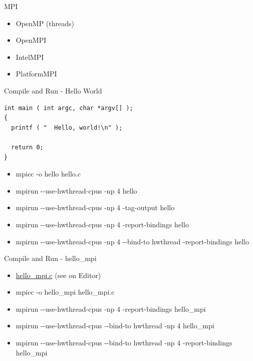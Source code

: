 \documentclass[ignorenonframetext,]{beamer}
\providecommand{\tightlist}{%
  \setlength{\itemsep}{0pt}\setlength{\parskip}{0pt}}
\begin{document}
\begin{frame}{MPI}


\begin{itemize}
\tightlist
\item
  OpenMP (threads)
\item
  OpenMPI
\item
  IntelMPI
\item
  PlatformMPI
\end{itemize}


\end{frame}

\begin{frame}[fragile]{Compile and Run - Hello World}

\begin{verbatim}
int main ( int argc, char *argv[] );
{
  printf ( "  Hello, world!\n" );

  return 0;
}
\end{verbatim}

\begin{itemize}
\tightlist
\item
  mpicc -o hello hello.c
\item
  mpirun -\/-use-hwthread-cpus -np 4 hello
\item
  mpirun -\/-use-hwthread-cpus -np 4 -tag-output hello
\item
  mpirun -\/-use-hwthread-cpus -np 4 -report-bindings hello
\item
  mpirun -\/-use-hwthread-cpus -np 4 -\/-bind-to hwthread
  -report-bindings hello
\end{itemize}

\end{frame}

\begin{frame}{Compile and Run - hello\_mpi}

\begin{itemize}
\item
  \href{file://hello_mpi.c}{hello\_mpi.c} (see on Editor)
\item
  mpicc -o hello\_mpi hello\_mpi.c
\item
  mpirun -\/-use-hwthread-cpus -np 4 -report-bindings hello\_mpi
\item
  mpirun -\/-use-hwthread-cpus -\/-bind-to hwthread -np 4 hello\_mpi
\item
  mpirun -\/-use-hwthread-cpus -\/-bind-to hwthread -np 4
  -report-bindings hello\_mpi
\end{itemize}

\end{frame}
\end{document}
